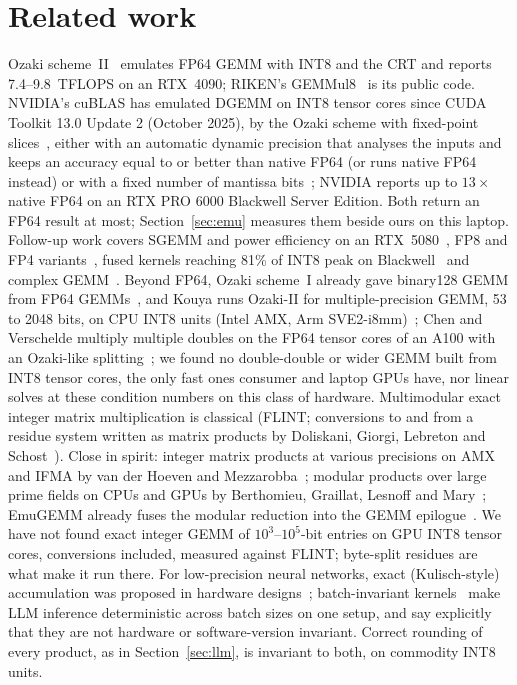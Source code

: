 \documentclass[11pt]{article}
\begin{document}
\section{Related work}
Ozaki scheme~II~\cite{ozaki2} emulates FP64 GEMM with INT8 and the CRT and reports 7.4--9.8~TFLOPS on an RTX~4090; RIKEN's GEMMul8~\cite{gemmul8}
is its public code. NVIDIA's cuBLAS has emulated DGEMM on INT8 tensor cores since CUDA Toolkit 13.0 Update 2 (October 2025),
by the Ozaki scheme with fixed-point slices~\cite{schwarz26}, either with an automatic dynamic precision that analyses the inputs and keeps an
accuracy equal to or better than native FP64 (or runs native FP64 instead) or with a fixed number of mantissa
bits~\cite{nvemu,cublasdoc}; NVIDIA reports up to $13\times$ native FP64 on an RTX PRO 6000 Blackwell Server Edition. Both
return an FP64 result at most; Section~\ref{sec:emu} measures them beside ours on this laptop. Follow-up work covers SGEMM and power efficiency on an RTX~5080~\cite{ozaki2sgemm}, FP8 and FP4
variants~\cite{fp8,fp4a,fp4b}, fused kernels reaching 81\% of INT8 peak on Blackwell~\cite{emugemm} and complex
GEMM~\cite{cgemm}. Beyond FP64, Ozaki scheme~I already gave binary128 GEMM from FP64 GEMMs~\cite{mukunoki21}, and
Kouya runs Ozaki-II for multiple-precision GEMM, 53 to 2048 bits, on CPU INT8 units (Intel AMX, Arm SVE2-i8mm)~\cite{ozamx};
Chen and Verschelde multiply multiple doubles on the FP64 tensor cores of an A100 with an Ozaki-like splitting~\cite{chenv26}; we found no double-double or wider GEMM built from INT8 tensor cores, the only fast ones consumer and laptop GPUs have, nor linear solves at these condition numbers on this
class of hardware. Multimodular exact integer matrix multiplication is classical (FLINT; conversions to and from a residue
system written as matrix products by Doliskani, Giorgi, Lebreton and Schost~\cite{dgls}). Close in spirit: integer matrix
products at various precisions on AMX and IFMA by van der Hoeven and Mezzarobba~\cite{vdhm}; modular products over large
prime fields on CPUs and GPUs by Berthomieu, Graillat, Lesnoff and Mary~\cite{bglm}; EmuGEMM already fuses the modular
reduction into the GEMM epilogue~\cite{emugemm}. We have not found exact integer GEMM of $10^3$--$10^5$-bit entries on GPU
INT8 tensor cores, conversions included, measured against FLINT; byte-split residues are what make it run there.
For low-precision neural networks, exact (Kulisch-style) accumulation was proposed in hardware designs~\cite{johnson18,positron}; batch-invariant kernels~\cite{he25} make LLM inference deterministic across batch sizes on one setup, and say explicitly that they are not hardware or software-version invariant. Correct rounding of every product, as in Section~\ref{sec:llm}, is invariant to both, on commodity INT8 units.
\end{document}
